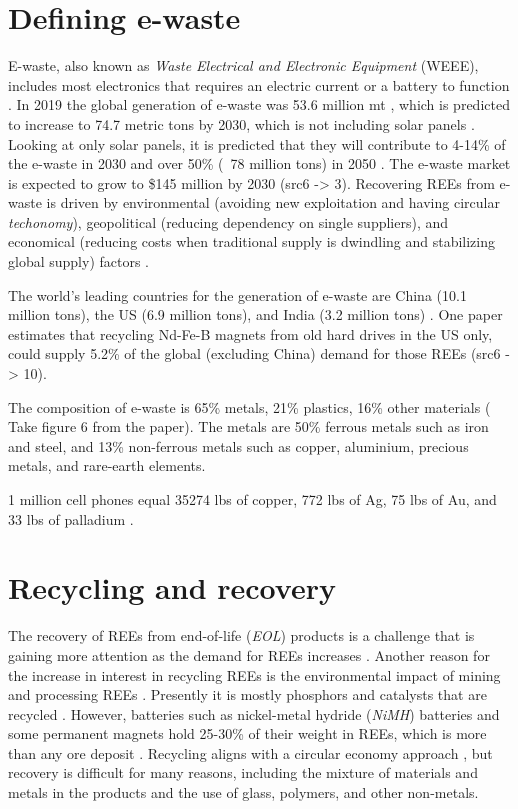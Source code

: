 
\section{Defining e-waste}

E-waste, also known as \textit{Waste Electrical and Electronic Equipment} (WEEE), includes most electronics that requires an electric current or a battery to function \cite{WEEE}. In 2019 the global generation of e-waste was 53.6 million mt \cite{sanchez2024}, which is predicted to increase to 74.7 metric tons by 2030, which is not including solar panels \cite{javed2024}. Looking at only solar panels, it is predicted that they will contribute to 4-14\% of the e-waste in 2030 and over 50\% (~78 million tons) in 2050 \cite{javed2024}. The e-waste market is expected to grow to \$145 million by 2030 (src6 -> 3). Recovering REEs from e-waste is driven by environmental (avoiding new exploitation and having circular \textit{techonomy}), geopolitical (reducing dependency on single suppliers), and economical (reducing costs when traditional supply is dwindling and stabilizing global supply) factors \cite{sanchez2024}.

The world's leading countries for the generation of e-waste are China (10.1 million tons), the US (6.9 million tons), and India (3.2 million tons) \cite{javed2024}. One paper estimates that recycling Nd-Fe-B magnets from old hard drives in the US only, could supply 5.2\% of the global (excluding China) demand for those REEs (src6 -> 10).

The composition of e-waste is 65\% metals, 21\% plastics, 16\% other materials (\cite{javed2024} Take figure 6 from the paper). The metals are 50\% ferrous metals such as iron and steel, and 13\% non-ferrous metals such as copper, aluminium, precious metals, and rare-earth elements. 

1 million cell phones equal 35274 lbs of copper, 772 lbs of Ag, 75 lbs of Au, and 33 lbs of palladium \cite{javed2024}.

\section{Recycling and recovery}

The recovery of REEs from end-of-life (\textit{EOL}) products is a challenge that is gaining more attention as the demand for REEs increases \cite{USDoE2024}. Another reason for the increase in interest in recycling REEs is the environmental impact of mining and processing REEs \cite{REELandscape}. Presently it is mostly phosphors and catalysts that are recycled \cite{britannica2024}. However, batteries such as nickel-metal hydride (\textit{NiMH}) batteries and some permanent magnets hold 25-30\% of their weight in REEs, which is more than any ore deposit \cite{britannica2024}. Recycling aligns with a circular economy approach \cite{circular2016}, but recovery is difficult for many reasons, including the mixture of materials and metals in the products and the use of glass, polymers, and other non-metals.

